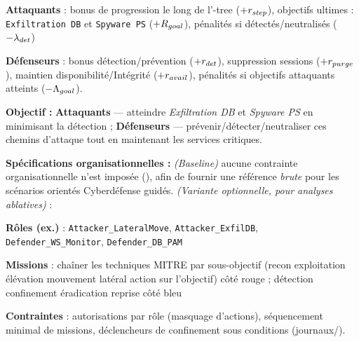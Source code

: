 \begin{enumerate*}[label={\roman*)}, itemjoin={; \quad}]
  \begin{enumerate*}[label={\alph*)}, itemjoin={; \ }]
    \item \textbf{Attaquants} : bonus de progression le long de l'-tree ($+r_{\small step}$), objectifs ultimes : \texttt{Exfiltration DB} et \texttt{Spyware PS} ($+R_{\small goal}$), pénalités si détectés/neutralisés ($-\lambda_{\small det}$)
    \item \textbf{Défenseurs} : bonus détection/prévention ($+r_{\small det}$), suppression sessions ($+r_{\small purge}$), maintien disponibilité/Intégrité ($+r_{\small avail}$), pénalités si objectifs attaquants atteints ($-\Lambda_{\small goal}$).
  \end{enumerate*}
  \item \textbf{Objectif :} \textbf{Attaquants} — atteindre \emph{Exfiltration DB} et \emph{Spyware PS} en minimisant la détection ; \textbf{Défenseurs} — prévenir/détecter/neutraliser ces chemins d'attaque tout en maintenant les services critiques.
\end{enumerate*}

\medskip
\textbf{Spécifications organisationnelles :} \emph{(Baseline)} aucune contrainte organisationnelle n'est imposée (\texttt{}), afin de fournir une référence \emph{brute} pour les scénarios orientés Cyberdéfense guidés. \emph{(Variante optionnelle, pour analyses ablatives)} :
\begin{enumerate*}[label={\roman*)}, itemjoin={; \quad}]
  \item \textbf{Rôles (ex.)} : \texttt{Attacker\_LateralMove}, \texttt{Attacker\_ExfilDB}, \texttt{Defender\_WS\_Monitor}, \texttt{Defender\_DB\_PAM}
  \item \textbf{Missions} : chaîner les techniques MITRE par sous-objectif (recon \textrightarrow{} exploitation \textrightarrow{} élévation \textrightarrow{} mouvement latéral \textrightarrow{} action sur l'objectif) côté rouge ; détection \textrightarrow{} confinement \textrightarrow{} éradication \textrightarrow{} reprise côté bleu
  \item \textbf{Contraintes} : autorisations par rôle (masquage d'actions), séquencement minimal de missions, déclencheurs de confinement sous conditions (journaux/).
\end{enumerate*}


